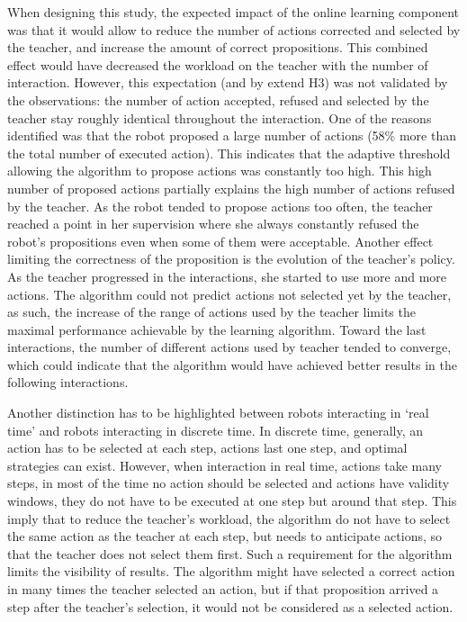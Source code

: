 When designing this study, the expected impact of the online learning component was that it would allow to reduce the number of actions corrected and selected by the teacher, and increase the amount of correct propositions. This combined effect would have decreased the workload on the teacher with the number of interaction. However, this expectation (and by extend H3) was not validated by the observations: the number of action accepted, refused and selected by the teacher stay roughly identical throughout the interaction. One of the reasons identified was that the robot proposed a large number of actions (58\% more than the total number of executed action). This indicates that the adaptive threshold allowing the algorithm to propose actions was constantly too high. This high number of proposed actions partially explains the high number of actions refused by the teacher. As the robot tended to propose actions too often, the teacher reached a point in her supervision where she always constantly refused the robot's propositions even when some of them were acceptable. Another effect limiting the correctness of the proposition is the evolution of the teacher's policy. As the teacher progressed in the interactions, she started to use more and more actions. The algorithm could not predict actions not selected yet by the teacher, as such, the increase of the range of actions used by the teacher limits the maximal performance achievable by the learning algorithm. Toward the last interactions, the number of different actions used by teacher tended to converge, which could indicate that the algorithm would have achieved better results in the following interactions.

Another distinction has to be highlighted between robots interacting in `real time' and robots interacting in discrete time. In discrete time, generally, an action has to be selected at each step, actions last one step, and optimal strategies can exist. However, when interaction in real time, actions take many steps, in most of the time no action should be selected and actions have validity windows, they do not have to be executed at one step but around that step. This imply that to reduce the teacher's workload, the algorithm do not have to select the same action as the teacher at each step, but needs to anticipate actions, so that the teacher does not select them first. Such a requirement for the algorithm limits the visibility of results. The algorithm might have selected a correct action in many times the teacher selected an action, but if that proposition arrived a step after the teacher's selection, it would not be considered as a selected action.

